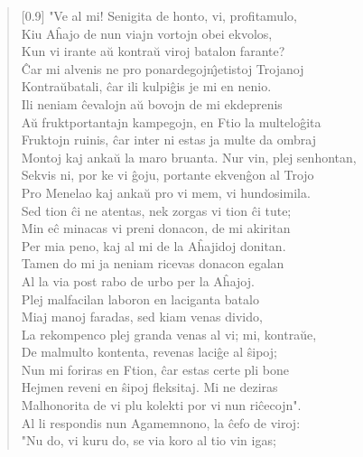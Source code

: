 \begin{verse}[0.9\textwidth]
          "Ve al mi! Senigita de honto, vi, profitamulo,\\
          Kiu A\^hajo de nun viajn vortojn obei ekvolos,\\
          Kun vi irante a\u u kontra\u u viroj batalon farante?\\
          \^Car mi alvenis ne pro ponardegojn\^{\j}etistoj Trojanoj\\
          Kontra\u ubatali, \^car ili kulpi\^gis je mi en nenio.\\
          Ili neniam \^cevalojn a\u u bovojn de mi ekdeprenis\\
          A\u u fruktportantajn kampegojn, en Ftio la multelo\^gita\\
          Fruktojn ruinis, \^car inter ni estas ja multe da ombraj\\
          Montoj kaj anka\u u la maro bruanta. Nur vin, plej senhontan,\\
          Sekvis ni, por ke vi \^goju, portante ekven\^gon al Trojo\\
          Pro Menelao kaj anka\u u pro vi mem, vi hundosimila.\\
          Sed tion \^ci ne atentas, nek zorgas vi tion \^ci tute;\\
          Min e\^c minacas vi preni donacon, de mi akiritan\\
          Per mia peno, kaj al mi de la A\^hajidoj donitan.\\
          Tamen do mi ja neniam ricevas donacon egalan\\
          Al la via post rabo de urbo per la A\^hajoj.\\
          Plej malfacilan laboron en laciganta batalo\\
          Miaj manoj faradas, sed kiam venas divido,\\
          La rekompenco plej granda venas al vi; mi, kontra\u ue,\\
          De malmulto kontenta, revenas laci\^ge al \^sipoj;\\
          Nun mi foriras en Ftion, \^car estas certe pli bone\\
          Hejmen reveni en \^sipoj fleksitaj. Mi ne deziras\\
          Malhonorita de vi plu kolekti por vi nun ri\^cecojn".\\
           \vin  Al li respondis nun Agamemnono, la \^cefo de viroj:\\
          "Nu do, vi kuru do, se via koro al tio vin igas;\\

\end{verse}
